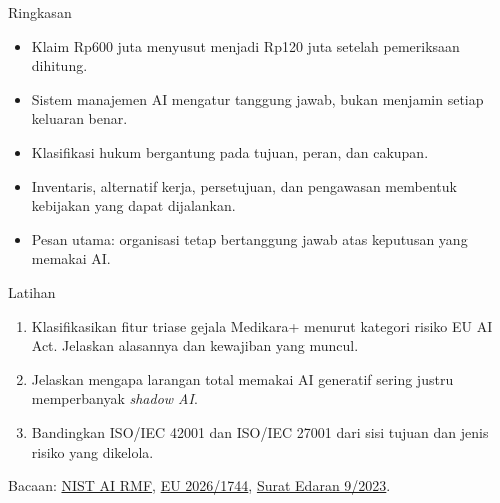 \documentclass[aspectratio=169, table, 12pt]{beamer}
\begin{document}
\begin{frame}{{\Large Ringkasan}}
  \vspace{6pt}
  \small
  \begin{itemize}
    \item Klaim Rp600 juta menyusut menjadi Rp120 juta setelah pemeriksaan dihitung.
    \item Sistem manajemen AI mengatur tanggung jawab, bukan menjamin setiap keluaran benar.
    \item Klasifikasi hukum bergantung pada tujuan, peran, dan cakupan.
    \item Inventaris, alternatif kerja, persetujuan, dan pengawasan membentuk kebijakan yang dapat
          dijalankan.
    \item Pesan utama: organisasi tetap bertanggung jawab atas keputusan yang memakai AI.
  \end{itemize}
\end{frame}

\begin{frame}{{\Large Latihan}}
  \vspace{6pt}
  \small
  \begin{enumerate}
    \item Klasifikasikan fitur triase gejala Medikara+ menurut kategori risiko EU AI Act. Jelaskan
          alasannya dan kewajiban yang muncul.
    \item Jelaskan mengapa larangan total memakai AI generatif sering justru memperbanyak
          \textit{shadow AI}.
    \item Bandingkan ISO/IEC 42001 dan ISO/IEC 27001 dari sisi tujuan dan jenis risiko yang
          dikelola.
  \end{enumerate}

  \vspace{4pt}
  \footnotesize Bacaan: \href{https://doi.org/10.6028/NIST.AI.100-1}{NIST AI RMF},
  \href{https://eur-lex.europa.eu/eli/reg/2026/1744/oj}{EU 2026/1744},
  \href{https://jdih.komdigi.go.id/produk_hukum/view/id/883}{Surat Edaran 9/2023}.
\end{frame}
\end{document}

